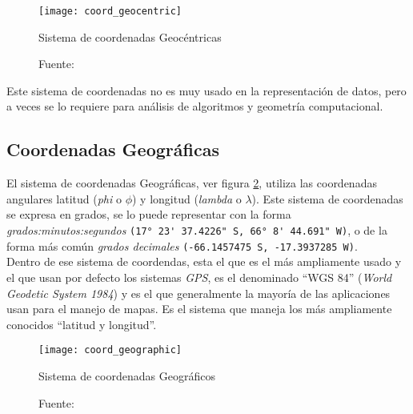         \begin{figure}[H]
          \begin{center}
            \texttt{[image: coord\_geocentric]}
            \caption{Sistema de coordenadas Geocéntricas}
            \label{fig:coord_geocentric}
            \caption*{Fuente: \cite{coords2009} }
          \end{center}
        \end{figure}

        Este sistema de coordenadas no es muy usado en la representación de datos, pero a veces se lo requiere para análisis de algoritmos y geometría computacional.

      \subsection{Coordenadas Geográficas} %
      \label{sub:coordenadas_geograficas}
        El sistema de coordenadas Geográficas, ver figura \ref{fig:coord_geographic}, utiliza las coordenadas angulares latitud  (\emph{phi} o ${\phi}$) y longitud (\emph{lambda} o ${\lambda}$). Este sistema de coordenadas se expresa en grados, se lo puede representar con la forma \emph{grados:minutos:segundos }\verb|(17° 23' 37.4226" S, 66° 8' 44.691" W)|, o de la forma más común \emph{grados decimales} \verb|(-66.1457475 S, -17.3937285 W)|. \\

  Dentro de ese sistema de coordendas, esta el que es el más ampliamente usado y el que usan por defecto los sistemas \emph{GPS}, es el denominado ``WGS 84'' (\emph{World Geodetic System 1984}) y es el que generalmente la mayoría de las aplicaciones usan para el manejo de mapas. Es el sistema que maneja los más ampliamente conocidos ``latitud y longitud''.\\

        \begin{figure}[H]
          \begin{center}
            \texttt{[image: coord\_geographic]}
            \caption{Sistema de coordenadas Geográficos}
            \label{fig:coord_geographic}
            \caption*{Fuente: \cite{coords2009} }
          \end{center}
        \end{figure}





